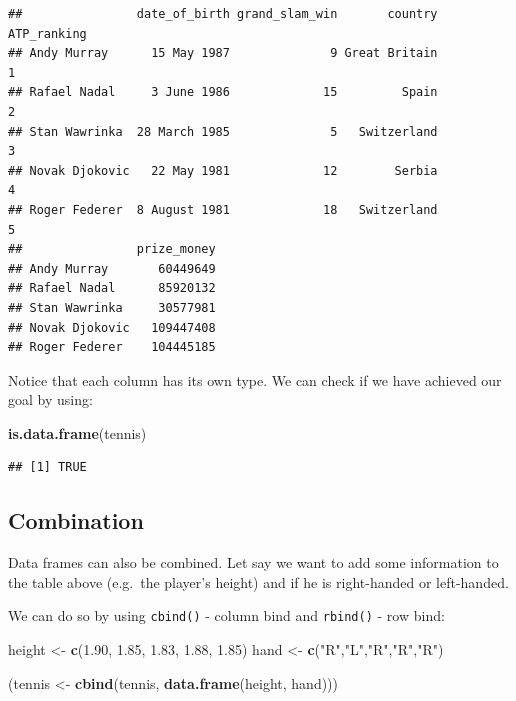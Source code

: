 \documentclass[12pt,]{krantz}
\newenvironment{Shaded}{\begin{snugshade}}{\end{snugshade}}
\newcommand{\KeywordTok}[1]{\textcolor[rgb]{0.27,0.27,0.27}{\textbf{#1}}}
\newcommand{\FloatTok}[1]{\textcolor[rgb]{0.06,0.06,0.06}{#1}}
\newcommand{\StringTok}[1]{\textcolor[rgb]{0.5,0.5,0.5}{#1}}
\newcommand{\NormalTok}[1]{#1}
\begin{document}
\begin{verbatim}
##                date_of_birth grand_slam_win       country ATP_ranking
## Andy Murray      15 May 1987              9 Great Britain           1
## Rafael Nadal     3 June 1986             15         Spain           2
## Stan Wawrinka  28 March 1985              5   Switzerland           3
## Novak Djokovic   22 May 1981             12        Serbia           4
## Roger Federer  8 August 1981             18   Switzerland           5
##                prize_money
## Andy Murray       60449649
## Rafael Nadal      85920132
## Stan Wawrinka     30577981
## Novak Djokovic   109447408
## Roger Federer    104445185
\end{verbatim}

Notice that each column has its own type. We can check if we have
achieved our goal by using:

\begin{Shaded}
\begin{Highlighting}[]
\KeywordTok{is.data.frame}\NormalTok{(tennis)}
\end{Highlighting}
\end{Shaded}

\begin{verbatim}
## [1] TRUE
\end{verbatim}

\subsection{Combination}\label{combination}

Data frames can also be combined. Let say we want to add some
information to the table above (e.g.~the player's height) and if he is
right-handed or left-handed.

We can do so by using \texttt{cbind()} - column bind and
\texttt{rbind()} - row bind:

\begin{Shaded}
\begin{Highlighting}[]
\NormalTok{height <-}\StringTok{ }\KeywordTok{c}\NormalTok{(}\FloatTok{1.90}\NormalTok{, }\FloatTok{1.85}\NormalTok{, }\FloatTok{1.83}\NormalTok{, }\FloatTok{1.88}\NormalTok{, }\FloatTok{1.85}\NormalTok{)}
\NormalTok{hand <-}\StringTok{ }\KeywordTok{c}\NormalTok{(}\StringTok{"R"}\NormalTok{,}\StringTok{"L"}\NormalTok{,}\StringTok{"R"}\NormalTok{,}\StringTok{"R"}\NormalTok{,}\StringTok{"R"}\NormalTok{)}

\NormalTok{(tennis <-}\StringTok{ }\KeywordTok{cbind}\NormalTok{(tennis, }\KeywordTok{data.frame}\NormalTok{(height, hand)))}
\end{Highlighting}
\end{Shaded}
\end{document}
